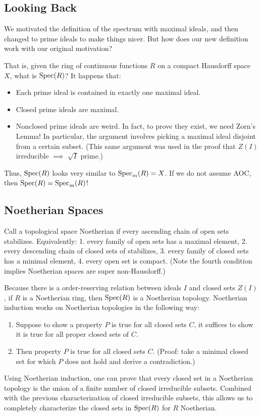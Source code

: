 \subsection{Looking Back}
We motivated the definition of the spectrum with maximal ideals, and then changed to prime ideals to make things nicer. But how does our new definition work with our original motivation?

That is, given the ring of continuous functions $R$ on a compact Hausdorff space $X$, what is $\operatorname{Spec}(R)$? It happens that:
\begin{itemize}
    \item Each prime ideal is contained in exactly one maximal ideal.
    \item Closed prime ideals are maximal.
    \item Nonclosed prime ideals are weird. In fact, to prove they exist, we need Zorn's Lemma! In particular, the argument involves picking a maximal ideal disjoint from a certain subset. (This same argument was used in the proof that $Z(I)$ irreducible $\implies$ $\sqrt{I}$ prime.)
\end{itemize}
Thus, $\operatorname{Spec}(R)$ looks very similar to $\operatorname{Spec}_m(R) = X$. If we do not assume AOC, then $\operatorname{Spec}(R) = \operatorname{Spec}_m(R)$!

\subsection{Noetherian Spaces}
Call a topological space Noetherian if every ascending chain of open sets stabilizes. Equivalently: 1. every family of open sets has a maximal element, 2. every descending chain of closed sets of stabilizes, 3. every family of closed sets has a minimal element, 4. every open set is compact. (Note the fourth condition implies Noetherian spaces are super non-Hausdorff.)

Because there is a order-reserving relation between ideals $I$ and closed sets $Z(I)$, if $R$ is a Noetherian ring, then $\operatorname{Spec}(R)$ is a Noetherian topology. Noetherian induction works on Noetherian topologies in the following way:
\begin{enumerate}
    \item Suppose to show a property $P$ is true for all closed sets $C$, it suffices to show it is true for all proper closed sets of $C$.
    \item Then property $P$ is true for all closed sets $C$. (Proof: take a minimal closed set for which $P$ does not hold and derive a contradiction.)
\end{enumerate}
Using Noetherian induction, one can prove that every closed set in a Noetherian topology is the union of a finite number of closed irreducible subsets. Combined with the previous characterization of closed irreducible subsets, this allows us to completely characterize the closed sets in $\operatorname{Spec}(R)$ for $R$ Noetherian.

